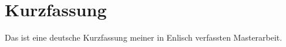 \chapter{Kurzfassung}
Das ist eine deutsche Kurzfassung meiner in Enlisch verfassten Masterarbeit.
\clearpage